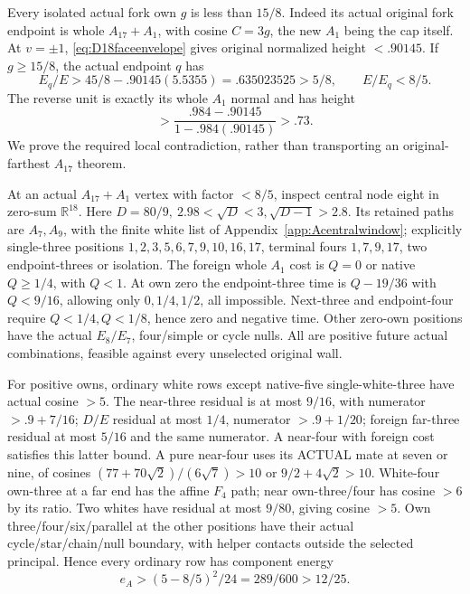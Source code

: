 \documentclass[11pt]{article}
\theoremstyle{definition}
\theoremstyle{remark}
\begin{document}
Every isolated actual fork own \(g\) is less than \(15/8\).
Indeed its actual original fork endpoint is whole \(A_{17}+A_1\),
with cosine \(C=3g\), the new \(A_1\) being the cap itself.
At \(v=\pm1\), \eqref{eq:D18faceenvelope} gives original normalized
height \(<.90145\).
If \(g\geq15/8\), the actual endpoint \(q\) has
\[
 E_q/E>45/8-.90145(5.5355)=.635023525>5/8,\qquad
 E/E_q<8/5 .
\]
The reverse unit is exactly its whole \(A_1\) normal and has
height
\[
 >\frac{.984-.90145}{1-.984(.90145)}>.73.
\]
We prove the required local contradiction, rather than transporting
an original-farthest \(A_{17}\) theorem.

At an actual \(A_{17}+A_1\) vertex with factor \(<8/5\),
inspect central node eight in zero-sum \(\mathbb R^{18}\).
Here \(D=80/9,\ 2.98<\sqrt D<3,\sqrt{D-1}>2.8\).
Its retained paths are \(A_7,A_9\), with the finite white list
of Appendix~\ref{app:Acentralwindow}; explicitly single-three
positions \(1,2,3,5,6,7,9,10,16,17\), terminal fours
\(1,7,9,17\), two endpoint-threes or isolation.
The foreign whole \(A_1\) cost is \(Q=0\) or native \(Q\geq1/4\),
with \(Q<1\).
At own zero the endpoint-three time is \(Q-19/36\) with
\(Q<9/16\), allowing only \(0,1/4,1/2\), all impossible.
Next-three and endpoint-four require \(Q<1/4,Q<1/8\),
hence zero and negative time. Other zero-own positions have the
actual \(E_8/E_7\), four/simple or cycle nulls.
All are positive future actual combinations, feasible against
every unselected original wall.

For positive owns, ordinary white rows except native-five
single-white-three have actual cosine \(>5\).
The near-three residual is at most \(9/16\), with numerator
\(>.9+7/16\); \(D/E\) residual at most \(1/4\), numerator
\(>.9+1/20\); foreign far-three residual at most \(5/16\)
and the same numerator. A near-four with foreign cost satisfies
this latter bound. A pure near-four uses its ACTUAL mate at seven
or nine, of cosines
\((77+70\sqrt2)/(6\sqrt7)>10\) or \(9/2+4\sqrt2>10\).
White-four own-three at a far end has the affine \(F_4\) path;
near own-three/four has cosine \(>6\) by its ratio.
Two whites have residual at most \(9/80\), giving cosine \(>5\).
Own three/four/six/parallel at the other positions have their actual
cycle/star/chain/null boundary, with helper contacts outside
the selected principal. Hence every ordinary row has component energy
\[
 e_A>(5-8/5)^2/24=289/600>12/25 .
\]
\end{document}

